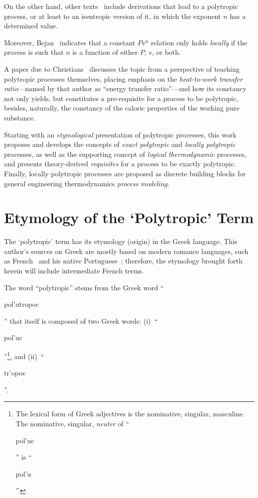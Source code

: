\documentclass[fleqn,11pt]{SelfArx}
\newcommand{\GRtxt}[1]{\begin{otherlanguage}{greek}{{#1}}\end{otherlanguage}}
\begin{document}
    On  the  other  hand,  other  texts~\cite{1986-JonesJB+HawkinsGA-Wiley,   2006-BejanA-Wiley,
    2015-KroosKA+PotterMC-Cengage} include derivations that lead to a polytropic process, or  at
    least to an isentropic version of it, in which the exponent $n$ has a determined value.

    Moreover, Bejan~\cite[p.~175]{2006-BejanA-Wiley} indicates that a constant  $Pv^n$  relation
    only holds \emph{locally} if the process is such that $n$ is a function of either $P$,  $v$,
    or both.

    A paper due to Christians~\cite{2012-ChristiansJ-IntJMechEngEduc} discusses the topic from a
    perspective  of  teaching  polytropic  processes  themselves,  placing   emphasis   on   the
    \emph{heat-to-work transfer ratio}---named by that author as ``energy transfer ratio''---and
    how its constancy not only yields, but constitutes a  pre-requisite  for  a  process  to  be
    polytropic, besides, naturally, the constancy of the caloric properties of the working  pure
    substance.

    Starting with  an  \emph{etymological}  presentation  of  polytropic  processes,  this  work
    proposes and develops the concepts of \emph{exact polytropic} and \emph{locally  polytropic}
    processes, as well as the supporting concept of \emph{logical thermodynamic} processes,  and
    presents theory-derived \emph{requisites} for a process to be exactly  polytropic.  Finally,
    locally  polytropic  processes  are  proposed  as  discrete  building  blocks  for   general
    engineering thermodynamics \emph{process modeling}.

\section{Etymology of the `Polytropic' Term}

    The `polytropic' term has its etymology  (origin)  in  the  Greek  language.  This  author's
    sources   on   Greek   are   mostly   based   on   modern   romance   languages,   such   as
    French~\cite{1968-Chantraine-Klincksieck,    2000-BaillyA-Hachette}    and    his     native
    Portuguese~\cite{1997-ManiatoglouMPF-Porto}; therefore, the etymology brought  forth  herein
    will include intermediate French terms.

    The word ``polytropic'' stems from the Greek word  ``\GRtxt{pol'utropoc}''  that  itself  is
    composed of two Greek  words:  (i)~``\GRtxt{pol'uc}''\footnote{The  lexical  form  of  Greek
    adjectives is the nominative, singular, masculine. The nominative,  singular,  \emph{neuter}
    of ``\GRtxt{pol'uc}'' is ``\GRtxt{pol'u}''.}, and (ii)~``\GRtxt{tr'opoc}''.
\end{document}
